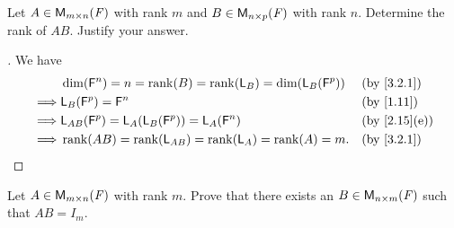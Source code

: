 \begin{ex}\label{ex:3.2.19}
	Let \(A \in \mathsf{M}_{{m} \times n}({\mathit{F}})\) with rank \(m\) and \(B \in \mathsf{M}_{{n} \times p}({\mathit{F}})\) with rank \(n\).
	Determine the rank of \(AB\).
	Justify your answer.
\end{ex}

\begin{proof}[]
	We have
	\begin{align*}
		         & \dim(\vs{F}^n) = n = \rk{B} = \rk{\L_B} = \dim(\L_B(\vs{F}^p)) &  & \by{3.2.1}   \\
		\implies & \L_B(\vs{F}^p) = \vs{F}^n                                      &  & \by{1.11}    \\
		\implies & \L_{AB}(\vs{F}^p) = \L_A(\L_B(\vs{F}^p)) = \L_A(\vs{F}^n)      &  & \by{2.15}[e] \\
		\implies & \rk{AB} = \rk{\L_{AB}} = \rk{\L_A} = \rk{A} = m.               &  & \by{3.2.1}
	\end{align*}
\end{proof}

\setcounter{ex}{20}
\begin{ex}\label{ex:3.2.21}
	Let \(A \in \mathsf{M}_{{m} \times n}({\mathit{F}})\) with rank \(m\).
	Prove that there exists an \(B \in \mathsf{M}_{{n} \times m}({\mathit{F}})\) such that \(AB = I_m\).
\end{ex}

